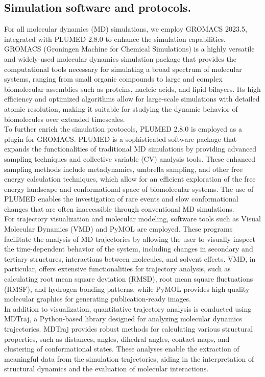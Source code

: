 \subsection{Simulation software and protocols.}

For all molecular dynamics (MD) simulations, we employ GROMACS 2023.5, integrated with PLUMED 2.8.0 to enhance the simulation capabilities.
GROMACS (Groningen Machine for Chemical Simulations) is a highly versatile and widely-used molecular dynamics simulation package that provides the computational tools necessary for simulating a broad spectrum of molecular systems, ranging from small organic compounds to large and complex biomolecular assemblies such as proteins, nucleic acids, and lipid bilayers.
Its high efficiency and optimized algorithms allow for large-scale simulations with detailed atomic resolution, making it suitable for studying the dynamic behavior of biomolecules over extended timescales.\\

To further enrich the simulation protocols, PLUMED 2.8.0 is employed as a plugin for GROMACS.
PLUMED is a sophisticated software package that expands the functionalities of traditional MD simulations by providing advanced sampling techniques and collective variable (CV) analysis tools.
These enhanced sampling methods include metadynamics, umbrella sampling, and other free energy calculation techniques, which allow for an efficient exploration of the free energy landscape and conformational space of biomolecular systems.
The use of PLUMED enables the investigation of rare events and slow conformational changes that are often inaccessible through conventional MD simulations.\\

For trajectory visualization and molecular modeling, software tools such as Visual Molecular Dynamics (VMD) and PyMOL are employed.
These programs facilitate the analysis of MD trajectories by allowing the user to visually inspect the time-dependent behavior of the system, including changes in secondary and tertiary structures, interactions between molecules, and solvent effects.
VMD, in particular, offers extensive functionalities for trajectory analysis, such as calculating root mean square deviation (RMSD), root mean square fluctuations (RMSF), and hydrogen bonding patterns, while PyMOL provides high-quality molecular graphics for generating publication-ready images.\\

In addition to visualization, quantitative trajectory analysis is conducted using MDTraj, a Python-based library designed for analyzing molecular dynamics trajectories.
MDTraj provides robust methods for calculating various structural properties, such as distances, angles, dihedral angles, contact maps, and clustering of conformational states.
These analyses enable the extraction of meaningful data from the simulation trajectories, aiding in the interpretation of structural dynamics and the evaluation of molecular interactions.\\

